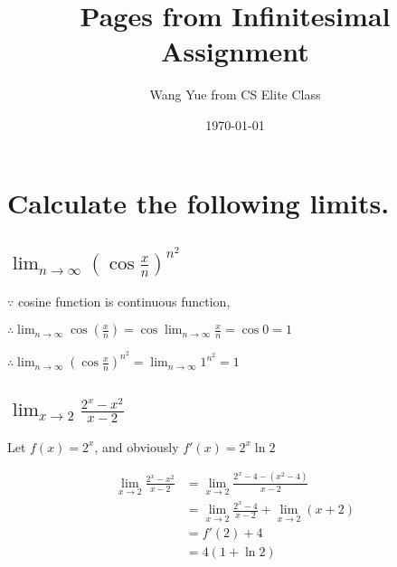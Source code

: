 \documentclass{article}
\begin{document}
    \title{Pages from Infinitesimal Assignment}
    \author{Wang Yue from CS Elite Class}
    \date{\today}

    \maketitle

    \section{Calculate the following limits.}

    \subsection{$\lim_{n \to \infty}(\cos \frac x n)^{n^2}$}

    $\because $ cosine function is continuous function,

    $\therefore \lim_{n \to \infty} \cos(\frac x n) = \cos \lim_{n \to \infty}\frac x n = \cos 0 = 1$

    $\therefore \lim_{n \to \infty}(\cos \frac x n)^{n^2} = \lim_{n \to \infty}1^{n^2} = 1$


    \subsection{$\lim_{x \to 2}\frac{2^x - x^2}{x - 2}$}

    Let $f(x) = 2^x$, and obviously $f'(x) = 2^x \ln 2$

    $$
    \begin{aligned}
        \lim_{x \to 2}\frac{2^x - x^2}{x - 2} &= \lim_{x \to 2}\frac{2^x - 4 - (x^2 - 4)}{x - 2} \\
        &= \lim_{x \to 2}\frac{2^x - 4}{x - 2} + \lim_{x \to 2}(x + 2) \\
        &= f'(2) + 4 \\
        &= 4(1 + \ln 2)
    \end{aligned}
    $$
\end{document}
